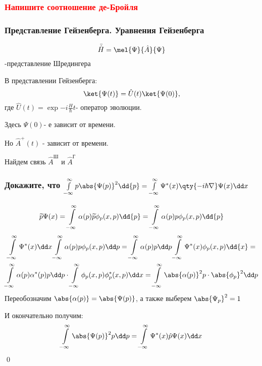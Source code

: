 \subsubsection{\textcolor{red} {Напишите соотношение де-Бройля} }
\subsubsection{{Представление Гейзенберга. Уравнения Гейзенберга} }

$$\bar{\hat H}=\mel{\Psi}{\hat A}{\Psi}$$-представление Шредингера

В представлении Гейзенберга:
$$\ket{\Psi(t)}=\hat U(t)\ket{\Psi(0)},$$
где $\hat U(t)=\exp{-i\frac{H}{\hbar}}t$- оператор эволюции.


Здесь $\Psi(0)$- е зависит от времени.

Но $\hat A^+(t)$ - зависит от времени.

Найдем связь $\hat A^{\text{Ш}}$ и $\hat A^{\text{Г}}$
\subsubsection{Докажите, что $\infint p \abs{\Psi(p)}^2\dd{p}=\infint\Psi^*(x)\qty{-i\hbar\nabla}\Psi(x)\dd x$}

{}

$$\tilde p\Psi(x)=\infint \alpha(p)\tilde p \phi_p(x,p)\dd{p}=\infint\alpha(p) p\phi_p(x,p)\dd{p}$$
\begin{gather*}
	\infint \Psi^*(x)\dd x\infint \alpha(p) p \phi_p(x,p)\dd p=
	\infint \alpha(p)p\dd p \infint \Psi^* (x) \phi_p(x,p) \dd{x}=
	\\
	\infint \alpha(p) \alpha^*(p) p \dd p \cdot \infint \phi_p(x,p) \phi^*_p(x,p) \dd x=\infint \abs{\alpha(p)}^2 p\cdot \abs{\phi_p}^2 \dd p
\end{gather*}
Переобозначим $\abs{\alpha(p)}=\abs{\Psi(p)}$, а также выберем $\abs{\Psi_p}^2=1$

И окончательно получим:
$$\infint \abs{\Psi(p)}^2 p \dd p = \infint \Psi^*(x) \hat p \Psi(x) \dd x $$
\qed